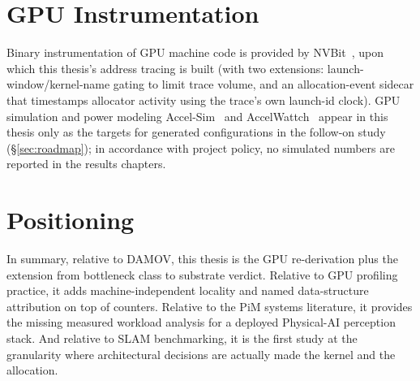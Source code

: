 \section{GPU Instrumentation}

Binary instrumentation of GPU machine code is provided by NVBit~\cite{villa2019nvbit}, upon which this thesis's address tracing is built (with two extensions: launch-window/kernel-name gating to limit trace volume, and an allocation-event sidecar that timestamps allocator activity using the trace's own launch-id clock). GPU simulation and power modeling Accel-Sim~\cite{khairy2020accelsim} and AccelWattch~\cite{kandiah2021accelwattch} appear in this thesis only as the targets for generated configurations in the follow-on study (\S\ref{sec:roadmap}); in accordance with project policy, no simulated numbers are reported in the results chapters.

\section{Positioning}

In summary, relative to DAMOV, this thesis is the GPU re-derivation plus the extension from bottleneck class to substrate verdict. Relative to GPU profiling practice, it adds machine-independent locality and named data-structure attribution on top of counters. Relative to the PiM systems literature, it provides the missing measured workload analysis for a deployed Physical-AI perception stack. And relative to SLAM benchmarking, it is the first study at the granularity where architectural decisions are actually made the kernel and the allocation.